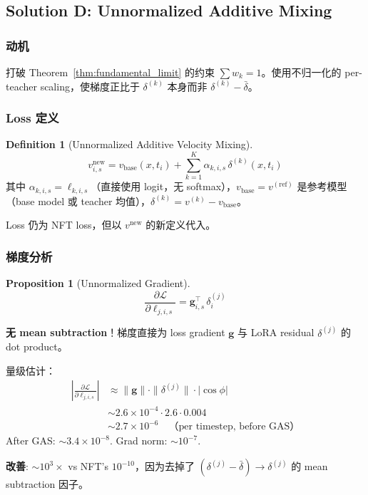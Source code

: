 \documentclass[11pt,a4paper]{article}
\newcommand{\loss}{\mathcal{L}}
\theoremstyle{definition}
\newtheorem{definition}{Definition}
\newtheorem{proposition}{Proposition}
\begin{document}
\subsection{Solution D: Unnormalized Additive Mixing}

\subsubsection{动机}
打破 Theorem~\ref{thm:fundamental_limit} 的约束 $\sum w_k = 1$。使用不归一化的 per-teacher scaling，使梯度正比于 $\delta^{(k)}$ 本身而非 $\delta^{(k)} - \bar{\delta}$。

\subsubsection{Loss 定义}

\begin{definition}[Unnormalized Additive Velocity Mixing]
\begin{equation}
\boxed{
v^{\mathrm{new}}_{i,s} = v_{\mathrm{base}}(x, t_i) + \sum_{k=1}^K \alpha_{k,i,s}\, \delta^{(k)}(x, t_i)
}
\label{eq:unnormalized_mix}
\end{equation}
其中 $\alpha_{k,i,s} = \ell_{k,i,s}$（直接使用 logit，无 softmax），$v_{\mathrm{base}} = v^{(\mathrm{ref})}$ 是参考模型（base model 或 teacher 均值），$\delta^{(k)} = v^{(k)} - v_{\mathrm{base}}$。

Loss 仍为 NFT loss，但以 $v^{\mathrm{new}}$ 的新定义代入。
\end{definition}

\subsubsection{梯度分析}

\begin{proposition}[Unnormalized Gradient]
\begin{equation}
\boxed{
\frac{\partial \loss}{\partial \ell_{j,i,s}} = \mathbf{g}_{i,s}^\top\, \delta^{(j)}_i
}
\label{eq:unnorm_gradient}
\end{equation}

\textbf{无 mean subtraction}！梯度直接为 loss gradient $\mathbf{g}$ 与 LoRA residual $\delta^{(j)}$ 的 dot product。

量级估计：
\begin{align}
\left|\frac{\partial \loss}{\partial \ell_{j,i,s}}\right| &\approx \|\mathbf{g}\| \cdot \|\delta^{(j)}\| \cdot |\cos\phi| \\
&\sim 2.6 \times 10^{-4} \cdot 2.6 \cdot 0.004 \\
&\sim 2.7 \times 10^{-6} \quad\text{（per timestep, before GAS）}
\end{align}
After GAS: $\sim 3.4 \times 10^{-8}$. Grad norm: $\sim 10^{-7}$.

\textbf{改善}: $\sim 10^3\times$ vs NFT's $10^{-10}$，因为去掉了 $(\delta^{(j)} - \bar{\delta}) \to \delta^{(j)}$ 的 mean subtraction 因子。
\end{proposition}
\end{document}
